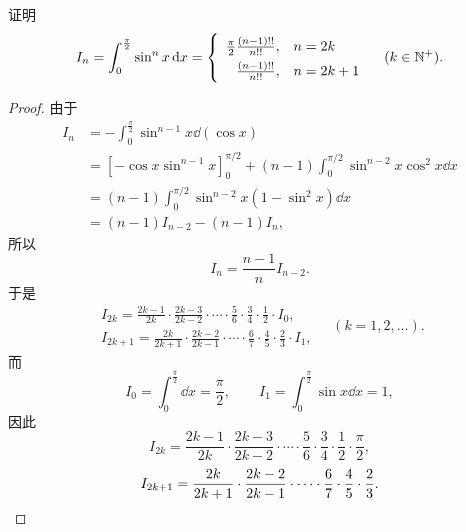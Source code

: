 \begin{example}\label{example:定积分.点火公式}
证明\begin{equation}\label{equation:定积分.点火公式}
\def\arraystretch{1.5}
I_n = \int_0^{\frac{\pi}{2}} \sin^n x \dd{x}
= \left\{ \begin{array}{rl}
\frac{\pi}{2}\frac{(n-1)!!}{n!!}, & n = 2k \\
\frac{(n-1)!!}{n!!}, & n = 2k+1
\end{array} \right.
\quad (k \in \mathbb{N}^+).
\end{equation}
\begin{proof}
由于\[
\begin{split}
I_n &= -\int_0^{\frac{\pi}{2}} \sin^{n-1} x \dd(\cos x) \\
&= [-\cos x \sin^{n-1} x]_0^{\pi/2}
	+ (n-1) \int_0^{\pi/2} \sin^{n-2} x \cos^2 x \dd{x} \\
&= (n-1) \int_0^{\pi/2} \sin^{n-2} x (1-\sin^2 x) \dd{x} \\
&= (n-1) I_{n-2} - (n-1) I_n,
\end{split}
\]所以\[
I_n = \frac{n-1}{n} I_{n-2}.
\]于是\[
\begin{split}
I_{2k} = \frac{2k-1}{2k} \cdot \frac{2k-3}{2k-2} \cdot \dotsm \cdot \frac{5}{6} \cdot \frac{3}{4} \cdot \frac{1}{2} \cdot I_0, \\
I_{2k+1} = \frac{2k}{2k+1} \cdot \frac{2k-2}{2k-1} \cdot \dotsm \cdot \frac{6}{7} \cdot \frac{4}{5} \cdot \frac{2}{3} \cdot I_1,
\end{split}
\quad(k=1,2,\dotsc).
\]而\[
I_0 = \int_0^{\frac{\pi}{2}} \dd{x} = \frac{\pi}{2},
\qquad
I_1 = \int_0^{\frac{\pi}{2}} \sin x \dd{x} = 1,
\]因此\[
I_{2k} = \frac{2k-1}{2k} \cdot \frac{2k-3}{2k-2} \cdot \dotsm \cdot \frac{5}{6} \cdot \frac{3}{4} \cdot \frac{1}{2} \cdot \frac{\pi}{2},
\]\[
I_{2k+1} = \frac{2k}{2k+1} \cdot \frac{2k-2}{2k-1} \cdot \dotsm \cdot \frac{6}{7} \cdot \frac{4}{5} \cdot \frac{2}{3}.
\qedhere
\]
\end{proof}
\end{example}

